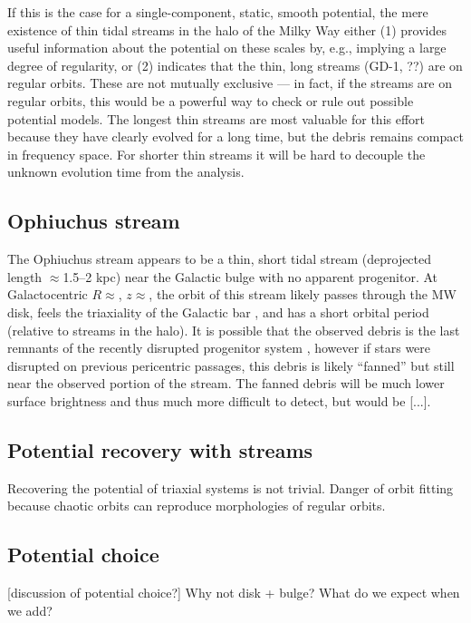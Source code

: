\documentclass[letterpaper,12pt,preprint]{aastex}
\begin{document}
If this is the case for a single-component, static, smooth potential, the mere existence of thin tidal streams in the halo of the Milky Way either (1) provides useful information about the potential on these scales by, e.g., implying a large degree of regularity, or (2) indicates that the thin, long streams (GD-1, ??) are on regular orbits. These are not mutually exclusive --- in fact, if the streams are on regular orbits, this would be a powerful way to check or rule out possible potential models. The longest thin streams are most valuable for this effort because they have clearly evolved for a long time, but the debris remains compact in frequency space. For shorter thin streams it will be hard to decouple the unknown evolution time from the analysis.

\subsection{Ophiuchus stream}

The Ophiuchus stream \citep{bernard14, sesar15} appears to be a thin, short tidal stream (deprojected length $\approx$1.5--2 kpc) near the Galactic bulge with no apparent progenitor. At Galactocentric $R \approx $, $z \approx $, the orbit of this stream likely passes through the MW disk, feels the triaxiality of the Galactic bar \citep[e.g.,][]{wegg13, wegg15}, and has a short orbital period (relative to streams in the halo). It is possible that the observed debris is the last remnants of the recently disrupted progenitor system \citep{sesar15}, however if stars were disrupted on previous pericentric passages, this debris is likely ``fanned'' but still near the observed portion of the stream. The fanned debris will be much lower surface brightness and thus much more difficult to detect, but would be [...].

\subsection{Potential recovery with streams}

Recovering the potential of triaxial systems is not trivial. Danger of orbit fitting because chaotic orbits can reproduce morphologies of regular orbits.

\subsection{Potential choice}
[discussion of potential choice?]
Why not disk + bulge? What do we expect when we add?
\end{document}
